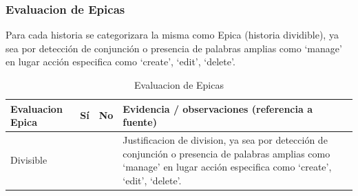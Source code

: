 \subsubsection{Evaluacion de Epicas}
Para cada historia se categorizara la misma como Epica (historia dividible), ya sea por detección de conjunción o presencia de palabras amplias como ‘manage’ en lugar acción especifica como ‘create’, ‘edit’, ‘delete’.%




\begin{table}[h!]
\centering
\begin{tabular}{|p{6cm}|c|c|p{5.5cm}|}
\hline
\textbf{Evaluacion Epica} & \textbf{Sí } & \textbf{No} & \textbf{Evidencia / observaciones (referencia a fuente)} \\
\hline
Divisible &  &  &  Justificacion de division, ya sea por detección de conjunción o presencia de palabras amplias como `manage' en lugar acción especifica como `create', `edit', `delete'.\\
\hline
\end{tabular}
\caption{Evaluacion de Epicas}
\end{table}
